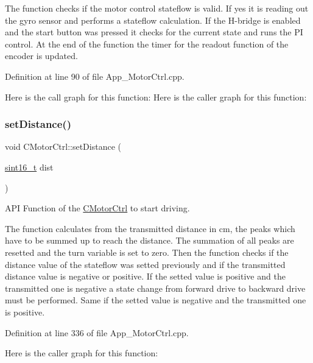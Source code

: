 The function checks if the motor control stateflow is valid. If yes it is reading out the gyro sensor and performs a stateflow calculation. If the H-\/bridge is enabled and the start button was pressed it checks for the current state and runs the PI control. At the end of the function the timer for the readout function of the encoder is updated. 

Definition at line 90 of file App\+\_\+\+Motor\+Ctrl.\+cpp.

Here is the call graph for this function\+:
Here is the caller graph for this function\+:
\mbox{\label{class_c_motor_ctrl_a0ae095bb6003ee63086361661f32ad3a}} 
\subsubsection{\texorpdfstring{setDistance()}{setDistance()}}
{\footnotesize\ttfamily void C\+Motor\+Ctrl\+::set\+Distance (\begin{DoxyParamCaption}\item[{\mbox{\hyperlink{_a_d_a_s___types_8h_ae4c9b951dbb7355563c313abca5e2e75}{sint16\+\_\+t}}}]{dist }\end{DoxyParamCaption})}



A\+PI Function of the \mbox{\hyperlink{class_c_motor_ctrl}{C\+Motor\+Ctrl}} to start driving. 

The function calculates from the transmitted distance in cm, the peaks which have to be summed up to reach the distance. The summation of all peaks are resetted and the turn variable is set to zero. Then the function checks if the distance value of the stateflow was setted previously and if the transmitted distance value is negative or positive. If the setted value is positive and the transmitted one is negative a state change from forward drive to backward drive must be performed. Same if the setted value is negative and the transmitted one is positive. 

Definition at line 336 of file App\+\_\+\+Motor\+Ctrl.\+cpp.

Here is the caller graph for this function\+:
\mbox{\label{class_c_motor_ctrl_a5c6d49d9b407e46aad0abe84bcaf16ec}} 
